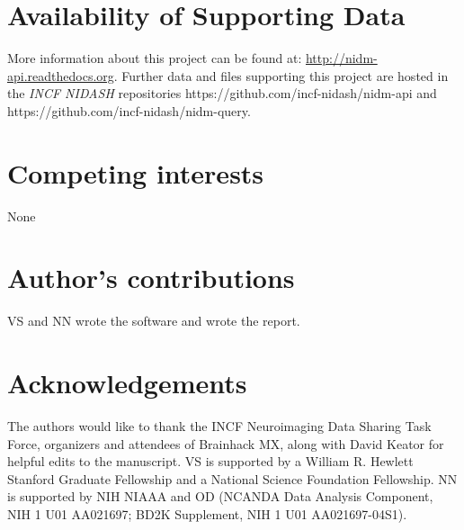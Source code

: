 \documentclass[twocolumn]{bmcart}%
\begin{document}

\begin{backmatter}

\section*{Availability of Supporting Data}
More information about this project can be found at: \url{http://nidm-api.readthedocs.org}. Further data and files supporting this project are hosted in the \emph{INCF NIDASH} repositories https://github.com/incf-nidash/nidm-api and https://github.com/incf-nidash/nidm-query.

\section*{Competing interests}
None

\section*{Author's contributions}
VS and NN wrote the software and wrote the report.

\section*{Acknowledgements}
The authors would like to thank the INCF Neuroimaging Data Sharing Task Force, organizers and attendees of Brainhack MX, along with David Keator for helpful edits to the manuscript. VS is supported by a William R. Hewlett Stanford Graduate Fellowship and a National Science Foundation Fellowship. NN is supported by NIH NIAAA and OD (NCANDA Data Analysis Component, NIH 1 U01 AA021697; BD2K Supplement, NIH 1 U01 AA021697-04S1).
  


\end{backmatter}
\end{document}
